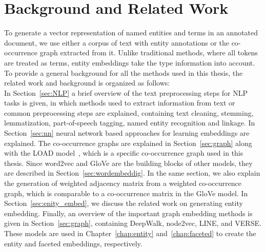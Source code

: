
\chapter{Background and Related Work}\label{chap:background}
To generate a vector representation of named entities and terms in an annotated document, we use either a corpus of text with entity annotations or the co-occurrence graph extracted from it. Unlike traditional methods, where all tokens are treated as terms, entity embeddings take the type information into account. To provide a general background for all the methods used in this thesis, the related work and background is organized as follows:\\
In Section~\ref{sec:NLP} a brief overview of the text preprocessing steps for NLP tasks is given, in which methods used to extract information from text or common preprocessing steps are explained, containing text cleaning, stemming, lemmatization, part-of-speech tagging, named entity recognition and linkage. In Section~\ref{sec:nn} neural network based approaches for learning embeddings are explained. The co-occurrence graphs are explained in Section~\ref{sec:graph} along with the LOAD model~, which is a specific co-occurrence graph used in this thesis. Since word2vec and GloVe are the building blocks of other models, they are described in Section~\ref{sec:wordembeddig}. In the same section, we also explain the generation of  weighted adjacency matrix from a weighted co-occurrence graph, which is comparable to a co-occurrence matrix in the GloVe model. In Section~\ref{sec:enity_embed}, we discuss the related work on generating entity embedding.  Finally, an overview of the important graph embedding methods is given in Section~\ref{sec:graph}, containing DeepWalk, node2vec, LINE, and VERSE. These models are used  in Chapter~\ref{chap:entity} and~\ref{chap:faceted} to create the entity and faceted embeddings, respectively. 

